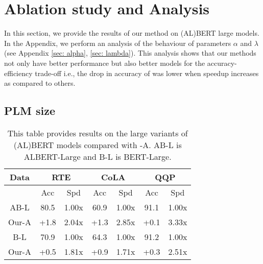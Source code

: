 

\section{Ablation study and Analysis}
In this section, we provide the results of our method on (AL)BERT large models.
In the Appendix, we perform an analysis of the behaviour of parameters $\alpha$ and $\lambda$ (see Appendix \ref{sec: alpha}, \ref{sec: lambda}). This analysis shows that our methods not only have better performance but also better models for the accuracy-efficiency trade-off i.e., the drop in accuracy of \algo{} was lower when speedup increases as compared to others.












\subsection{PLM size}
\begin{wraptable}{r}{0.59\textwidth}  %
\centering
\small
\begin{tabular}{ccccccc}
\hline
\textbf{Data} & \multicolumn{2}{c}{\textbf{RTE}} & \multicolumn{2}{c}{\textbf{CoLA}} & \multicolumn{2}{c}{\textbf{QQP}} \\ \hline
                       & Acc             & Spd             & Acc             & Spd              & Acc             & Spd             \\ \hline
AB-L                   & 80.5            & 1.00x           & 60.9            & 1.00x            & 91.1            & 1.00x           \\
Our-A                  & +1.8            & 2.04x           & +1.3            & 2.85x            & +0.1            & 3.33x           \\ \hline
B-L                    & 70.9            & 1.00x           & 64.3            & 1.00x            & 91.2            & 1.00x           \\
Our-A                  & +0.5            & 1.81x           & +0.9            & 1.71x            & +0.3            & 2.51x           \\ \hline
\end{tabular}
\caption{This table provides results on the large variants of (AL)BERT models compared with \algo{}-A. AB-L is ALBERT-Large and B-L is BERT-Large.}
\label{tab:large_models}
\end{wraptable}


